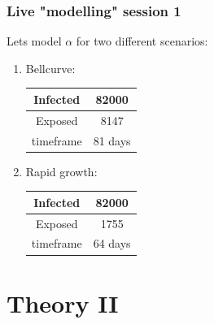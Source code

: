\documentclass{beamer}
\begin{document}
\begin{frame}
\frametitle{Live "modelling" session 1} 
	Lets model $\alpha$ for  two different scenarios:\\\vspace{0.3cm}
	\begin{enumerate}
		\item Bellcurve:\\\vspace{0.1cm}
			\begin{tabular}{| c | c |}
				\hline
				Infected & 82000 \\
				\hline
				Exposed & 8147 \\
				\hline
				timeframe & 81 days \\
				\hline
			\end{tabular} \vspace{0.5cm}

		\item Rapid growth:\\\vspace{0.1cm}
			\begin{tabular}{| c | c |}
				\hline
				Infected & 82000 \\
				\hline
				Exposed & 1755 \\
				\hline
				timeframe & 64 days \\
				\hline
			\end{tabular}
	\end{enumerate}
\end{frame}

\section{Theory II}
\end{document}
